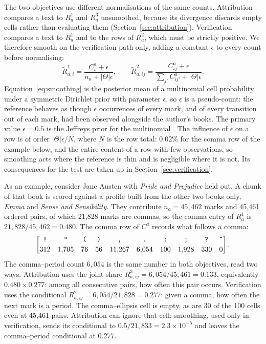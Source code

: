 \documentclass[11pt]{article}
\begin{document}
The two objectives use different normalisations of the same counts.
Attribution compares a text to \(R^1_a\) and \(R^3_a\) unsmoothed,
because its divergence discards empty cells rather than evaluating them
(Section~\ref{sec:attribution}).
Verification compares a text to \(R^1_a\) and to the rows of \(R^2_a\),
which must be strictly positive.  We therefore smooth on the verification
path only, adding a constant \(\epsilon\) to every count before
normalising:
\begin{equation}
  \widetilde R^{1}_{a,i} = \frac{C^a_i + \epsilon}{n_a + |\Theta|\epsilon},
  \qquad
  \widetilde R^{2}_{a,ij}
    = \frac{C^a_{ij} + \epsilon}{\sum_{j'} C^a_{ij'} + |\Theta|\epsilon} .
  \label{eq:smoothing}
\end{equation}
Equation~\eqref{eq:smoothing} is the posterior mean of a multinomial cell
probability under a symmetric Dirichlet prior with parameter \(\epsilon\),
so \(\epsilon\) is a pseudo-count: the reference behaves as though
\(\epsilon\) occurrences of every mark, and of every transition out of
each mark, had been observed alongside the author's books.  The primary
value \(\epsilon = 0.5\) is the Jeffreys prior for the multinomial
\cite{jeffreys1946}. The influence of
\(\epsilon\) on a row is of order \(|\Theta|\epsilon/N\), where \(N\)
is the row total: 0.02\% for the comma row of the example below, and the
entire content of a row with few observations, so smoothing acts where the
reference is thin and is negligible where it is not.  Its consequences for
the test are taken up in Section~\ref{sec:verification}.

As an example, consider Jane Austen with \emph{Pride and Prejudice} held
out.  A chunk of that book is scored against a profile built from the other
two books only, \emph{Emma} and \emph{Sense and Sensibility}.  They
contribute \(n_a = 45{,}462\) marks and 45{,}461 ordered pairs, of which
21{,}828 marks are commas, so the comma entry of \(R^1_a\) is
\(21{,}828/45{,}462 = 0.480\).  The comma row of \(C^a\) records what
follows a comma:
\[
  \begin{bmatrix}
    \texttt{!} & \texttt{"} & \texttt{(} & \texttt{)} & \texttt{,}
      & \texttt{.} & \texttt{:} & \texttt{;} & \texttt{?} & \texttt{\^{}} \\[2pt]
    312 & 1{,}705 & 76 & 56 & 11{,}267 & 6{,}054 & 100 & 1{,}928 & 330 & 0
  \end{bmatrix}.
\]
The comma--period count \(6{,}054\) is the same number in both objectives,
read two ways.  Attribution uses the joint share
\(R^{3}_{a,ij} = 6{,}054/45{,}461 = 0.133\), equivalently
\(0.480 \times 0.277\): among all consecutive pairs, how often this pair
occurs.  Verification uses the conditional
\(R^{2}_{a,ij} = 6{,}054/21{,}828 = 0.277\): given a comma, how often the
next mark is a period.  The comma--ellipsis cell is empty, as are 30 of the
100 cells even at 45{,}461 pairs.  Attribution can ignore that cell;
smoothing, used only in verification, sends its conditional to
\(0.5/21{,}833 = 2.3 \times 10^{-5}\) and leaves the comma--period
conditional at 0.277.
\end{document}
